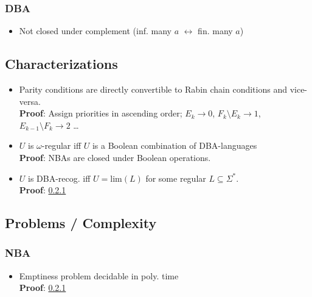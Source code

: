 \documentclass{article}
\begin{document}
\subsubsection{DBA}
\begin{itemize}
	\item Not closed under complement (inf. many $a$ $\leftrightarrow$ fin. many $a$)
\end{itemize}

\subsection{Characterizations}
\begin{itemize}
	\item Parity conditions are directly convertible to Rabin chain conditions and vice-versa. \\
		\textbf{Proof}: Assign priorities in ascending order; $E_k \rightarrow 0$, $F_k \setminus E_k \rightarrow 1$, $E_{k-1} \setminus F_k \rightarrow 2$ \dots
	\item $U$ is $\omega$-regular iff $U$ is a Boolean combination of DBA-languages \\
		\textbf{Proof}: NBAs are closed under Boolean operations.
	\item $U$ is DBA-recog. iff $U = \text{lim}(L)$ for some regular $L \subseteq \Sigma^*$. \\
		\textbf{Proof}: \ref{} %
\end{itemize}

\subsection{Problems / Complexity}
\subsubsection{NBA}
\begin{itemize}
	\item Emptiness problem decidable in poly. time \\
    	\textbf{Proof}: \ref{} %
\end{itemize}


\newpage
\end{document}
